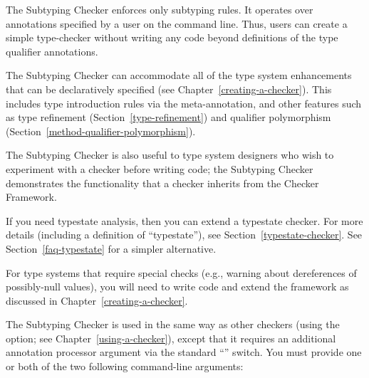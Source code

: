 
The Subtyping Checker enforces only subtyping rules.  It operates over
annotations specified by a user on the command line.  Thus, users can
create a simple type-checker without writing any code beyond definitions of
the type qualifier annotations.

The Subtyping Checker can accommodate all of the type system enhancements that
can be declaratively specified (see Chapter~\ref{creating-a-checker}).
This includes type introduction rules via the
 meta-annotation, and other features such as
type refinement (Section~\ref{type-refinement}) and
qualifier polymorphism (Section~\ref{method-qualifier-polymorphism}).

The Subtyping Checker is also useful to type system designers who wish to
experiment with a checker before writing code; the Subtyping Checker
demonstrates the functionality that a checker inherits from the Checker
Framework.

If you need typestate analysis, then you can extend a typestate checker.
For more details (including a definition of ``typestate''), see
Section~\ref{typestate-checker}.
See Section~\ref{faq-typestate} for a simpler alternative.

For type systems that require special checks (e.g., warning about
dereferences of possibly-null values), you will need to write code and
extend the framework as discussed in Chapter~\ref{creating-a-checker}.



\begin{sloppypar}
The Subtyping Checker is used in the same way as other checkers (using the
 option; see Chapter~\ref{using-a-checker}), except that it
requires an additional annotation processor argument via the standard
``'' switch. You must provide one or both of the two following
command-line arguments:
\end{sloppypar}

